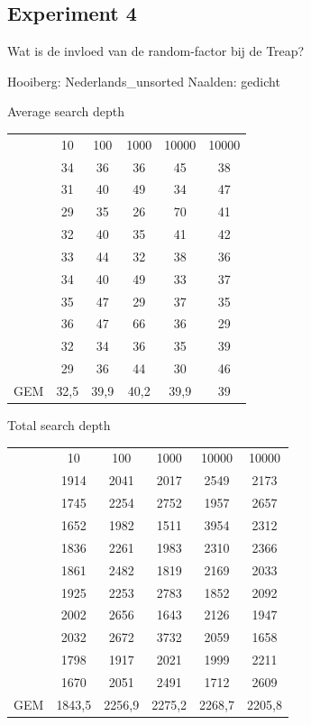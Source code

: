 \documentclass[a4paper,10pt]{article}
\begin{document}
\subsection{Experiment 4}
Wat is de invloed van de random-factor bij de Treap?

Hooiberg:
Nederlands\_unsorted
Naalden:
gedicht

Average search depth \\
\begin{center}
\begin{tabular}{c c c c c c}
 & 10 & 100 & 1000 & 10000 & 10000 \\
 & 34 & 36 & 36 & 45 & 38 \\
 & 31 & 40 & 49 & 34 & 47 \\
 & 29 & 	35 & 26 & 70 & 41 \\
 & 32 & 	40 & 35 & 41 & 42 \\
 & 33 & 	44 & 32 & 38 & 36 \\
 & 34 & 	40 & 49 & 33 & 37 \\
 & 35 & 	47 & 29 & 37 & 35 \\
 & 36 & 	47 & 66 & 36 & 29 \\
 & 32 & 	34 & 36 & 35 & 39 \\
 & 29 & 	36 & 44 & 30 & 46 \\
GEM & 32,5 & 39,9 & 40,2 & 39,9 & 39 \\
\end{tabular}
\end{center}
Total search depth \\
\begin{center}
\begin{tabular}{c c c c c c}
 & 10 & 100 & 1000 & 10000 & 10000 \\
 & 1914 & 2041 & 2017 & 2549 & 2173 \\
 & 1745 & 2254 & 2752 & 1957 & 2657 \\
 & 1652 & 1982 & 1511 & 3954 & 2312 \\
 & 1836 & 2261 & 1983 & 2310 & 2366 \\
 & 1861 & 2482 & 1819 & 2169 & 2033 \\
 & 1925 & 2253 & 2783 & 1852 & 2092 \\
 & 2002 & 2656 & 1643 & 2126 & 1947 \\
 & 2032 & 2672 & 3732 & 2059 & 1658 \\
 & 1798 & 1917 & 2021 & 1999 & 2211 \\
 & 1670 & 2051 & 2491 & 1712 & 2609 \\
GEM & 1843,5 & 2256,9 & 2275,2 & 2268,7 & 2205,8 \\
\end{tabular}
\end{center}
\end{document}

